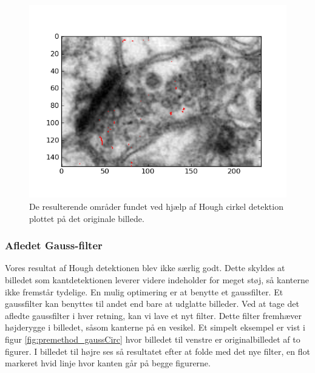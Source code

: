 \begin{figure}[H]
	\centering
	\includegraphics[scale=0.8]{files/premethod/img/houghres.png}
	\caption{De resulterende områder fundet ved hjælp af Hough cirkel detektion plottet på det originale billede.\label{fig:premethod_houghCellLinesThresholdOnOrig}}
\end{figure}


\subsubsection{Afledet Gauss-filter}
Vores resultat af Hough detektionen blev ikke særlig godt. Dette skyldes at billedet som kantdetektionen leverer videre indeholder for meget støj, så kanterne ikke fremstår tydelige. En mulig optimering er at benytte et gaussfilter. Et gaussfilter kan benyttes til andet end bare at udglatte billeder. Ved at tage det afledte gaussfilter i hver retning, kan vi lave et nyt filter. Dette filter fremhæver højderygge i billedet, såsom kanterne på en vesikel. Et simpelt eksempel er vist i figur \ref{fig:premethod_gaussCirc} hvor billedet til venstre er originalbilledet af to figurer. I billedet til højre ses så resultatet efter at folde med det nye filter, en flot markeret hvid linje hvor kanten går på begge figurerne.

